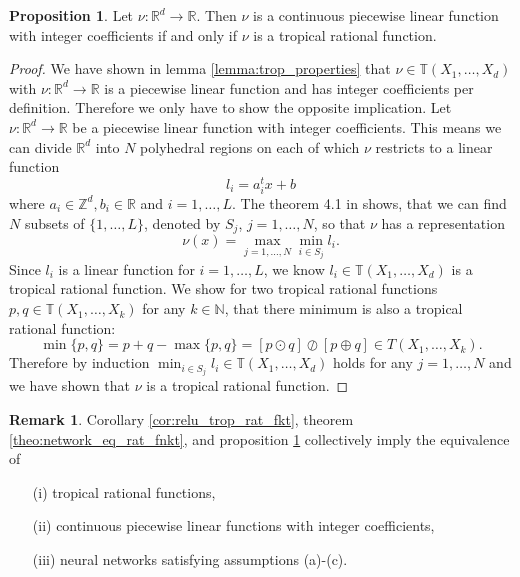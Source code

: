 \documentclass{article}
\theoremstyle{definition}
\newtheorem{proposition}[theorem]{Proposition}
\newtheorem{remark}[theorem]{Remark}
\begin{document}
\begin{proposition}\hspace{1sp}\cite{zhang2018tropical}
\label{prop:plin_trop_fnkt}
Let $\nu : \mathbb{R}^{d} \to \mathbb{R}$. Then $\nu$ is a continuous piecewise linear function with integer coefficients if and only if $\nu$ is a tropical rational function.
\end{proposition}
\begin{proof}
We have shown in lemma \ref{lemma:trop_properties} that $\nu \in \mathbb{T}(X_1, \dots, X_d)$ with $\nu: \mathbb{R}^{d} \to \mathbb{R}$ is a piecewise linear function and has integer coefficients per definition. Therefore we only have to show the opposite implication. Let $\nu : \mathbb{R}^{d} \to \mathbb{R}$ be a piecewise linear function with integer coefficients. This means we can divide $\mathbb{R}^{d}$ into $N$ polyhedral regions on each of which $\nu$ restricts to a linear function
$$l_{i} = a_{i}^{t}x + b$$
where $a_{i} \in \mathbb{Z}^{d}, b_{i} \in \mathbb{R}$ and $i=1, \dots, L$. The theorem 4.1 in \cite{tarela1999region} shows, that we can find $N$ subsets of $\{ 1, \dots , L\}$, denoted by $S_{j}$, $j=1, \dots , N$, so that $\nu$ has a representation
$$\nu (x) = \max_{j=1,\dots,N} \min_{i \in S_j} l_i.$$
Since $l_{i}$ is a linear function for $i=1, \dots, L$, we know $l_i \in \mathbb{T}(X_1, \dots, X_d)$ is a tropical rational function. We show for two tropical rational functions $p,q \in \mathbb{T}(X_1, \dots , X_k)$ for any $k \in \mathbb{N}$, that there minimum is also a tropical rational function:
$$\min\{p,q\} = p + q - \max\{p,q\} = [p \odot q] \oslash [p \oplus q] \in T(X_1, \dots , X_k).$$
Therefore by induction $\min_{i \in S_j} l_i \in \mathbb{T}(X_1, \dots , X_d)$ holds for any $j=1, \dots , N$ and we have shown that $\nu$ is a tropical rational function.
\end{proof}

\begin{remark}\hspace{1sp}\cite{zhang2018tropical}
\label{rem:key_rem}
Corollary \ref{cor:relu_trop_rat_fkt}, theorem \ref{theo:network_eq_rat_fnkt}, and proposition \ref{prop:plin_trop_fnkt} collectively imply the equivalence of
\begin{itemize}
\item[(i)]
tropical rational functions,
\item[(ii)]
continuous piecewise linear functions with integer coefficients,
\item[(iii)]
neural networks satisfying assumptions (a)-(c).
\end{itemize}
\end{remark}
\end{document}
